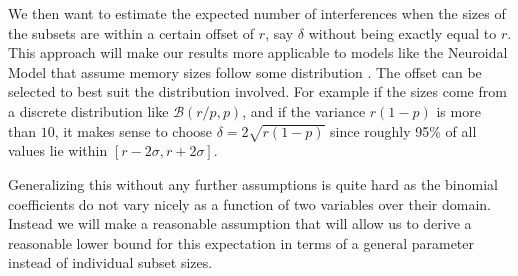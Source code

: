 We then want to estimate the expected number of interferences when the sizes of the subsets are within a certain offset of $r$, say $\delta$ without being exactly equal to $r$. This approach will make our results more applicable to models like the Neuroidal Model that assume memory sizes follow some distribution \cite{valiant2005memorization}. The offset can be selected to best suit the distribution involved. For example if the sizes come from a discrete distribution like $\mathcal{B}(r/p,p)$, and if the variance $r(1-p)$ is more than $10$, it makes sense to choose $\delta  = 2\sqrt{r(1-p)}$ since roughly 95\% of all values lie within $[r-2\sigma,r+2\sigma]$.
 
Generalizing this without any further assumptions is quite hard as the binomial coefficients do not vary nicely as a function of two variables over their domain. Instead we will make a reasonable assumption that will allow us to derive a reasonable lower bound for this expectation in terms of a general parameter instead of individual subset sizes. 

